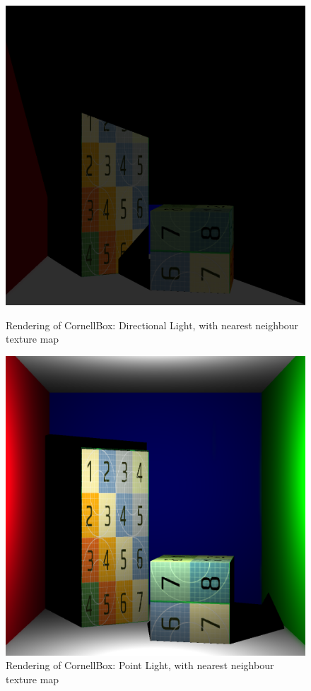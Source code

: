 \documentclass[a4paper]{myarticle}
\begin{document}
\begin{figure}[H]
    \begin{minipage}[t]{.4\textwidth}
        \centering
        \includegraphics[width=\textwidth]{q2/CornellBox/directional_light.png}
        \caption{Rendering of CornellBox: Directional Light, with nearest neighbour texture map}
    \end{minipage}
    \hfill
    \begin{minipage}[t]{.4\textwidth}
        \centering
        \includegraphics[width=\textwidth]{q2/CornellBox/point_light.png}
        \caption{Rendering of CornellBox: Point Light, with nearest neighbour texture map}
    \end{minipage}
\end{figure}
\end{document}
